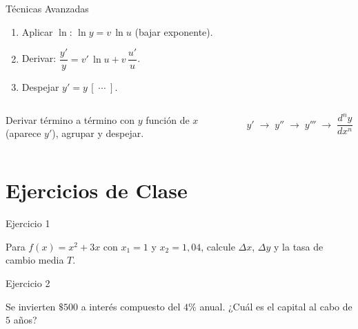 \documentclass[aspectratio=169]{beamer}
\begin{document}
\begin{frame}{Técnicas Avanzadas}
  \begin{mwpasos}[Derivación logarítmica: $y = u(x)^{v(x)}$]
    \begin{enumerate}
      \item Aplicar $\ln$: $\ln y = v\,\ln u$ \quad (bajar exponente).
      \item Derivar: $\dfrac{y'}{y} = v'\,\ln u + v\,\dfrac{u'}{u}$.
      \item Despejar $y' = y\,[\;\cdots\;]$.
    \end{enumerate}
  \end{mwpasos}
  \vspace{2pt}
  \begin{columns}[T]
    \begin{mwextra}[Implícita]
      Derivar término a término con $y$ función de $x$ (aparece $y'$), agrupar y despejar.
    \end{mwextra}
    \begin{mwextra}[Sucesivas]
      $y' \;\to\; y'' \;\to\; y''' \;\to\; \dfrac{d^{n}y}{dx^{n}}$
    \end{mwextra}
  \end{columns}
\end{frame}

\section{Ejercicios de Clase}

\begin{frame}{Ejercicio 1}
  \begin{mwejercicio}
    Para $f(x) = x^{2} + 3x$ con $x_1 = 1$ y $x_2 = 1{,}04$, calcule $\Delta x$, $\Delta y$ y la tasa de cambio media $T$.
  \end{mwejercicio}
  \vspace{3.5cm}
\end{frame}

\begin{frame}{Ejercicio 2}
  \begin{mwejercicio}
    Se invierten $\$500$ a interés compuesto del $4\%$ anual. ¿Cuál es el capital al cabo de $5$ años?
  \end{mwejercicio}
  \vspace{3.5cm}
\end{frame}
\end{document}
